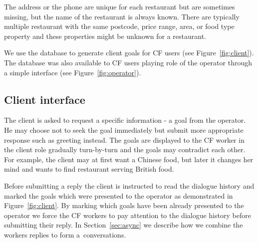 \documentclass[runningheads,a4paper]{llncs}
\begin{document}
The address or the phone are unique for each restaurant but are sometimes missing, but the name of the restaurant is always known. 
There are typically multiple restaurant with the same postcode, price range, area, or food type property and these properties might be unknown for a restaurant.

We use the database to generate client goals for CF users (see Figure~\ref{fig:client}).
The database was also available to CF users playing role of the operator through a simple interface (see Figure~\ref{fig:operator}).

\vspace{-1.00em}
\subsection{Client interface}
\label{sec:client}

The client is asked to request a specific information - a goal from the operator.
He may choose not to seek the goal immediately but submit more appropriate response such as greeting instead.
The goals are displayed to the CF worker in the client role gradually turn-by-turn and the goals may contradict each other.
For example, the client may at first want a Chinese food, but later it changes her mind and wants to find restaurant serving British food.

Before submitting a reply the client is instructed to read the dialogue history and marked the goals which were presented to the operator as demonstrated in Figure~\ref{fig:client}.
By marking which goals have been already presented to the operator we force the CF workers to pay attention to the dialogue history before submitting their reply.
In Section~\ref{sec:async} we describe how we combine the workers replies to form a~conversations.
\end{document}
